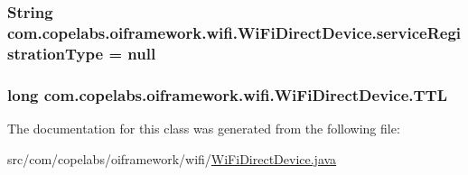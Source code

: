 \subsubsection[{service\+Registration\+Type}]{\setlength{\rightskip}{0pt plus 5cm}String com.\+copelabs.\+oiframework.\+wifi.\+Wi\+Fi\+Direct\+Device.\+service\+Registration\+Type = null\hspace{0.3cm}{\ttfamily [private]}}\label{classcom_1_1copelabs_1_1oiframework_1_1wifi_1_1_wi_fi_direct_device_a53d05b7aa0924e76b0c2b567affb1112}
\hypertarget{classcom_1_1copelabs_1_1oiframework_1_1wifi_1_1_wi_fi_direct_device_aedc5d49186dfa466662e225490009b2c}{}
\subsubsection[{T\+T\+L}]{\setlength{\rightskip}{0pt plus 5cm}long com.\+copelabs.\+oiframework.\+wifi.\+Wi\+Fi\+Direct\+Device.\+T\+T\+L\hspace{0.3cm}{\ttfamily [private]}}\label{classcom_1_1copelabs_1_1oiframework_1_1wifi_1_1_wi_fi_direct_device_aedc5d49186dfa466662e225490009b2c}


The documentation for this class was generated from the following file\+:\begin{DoxyCompactItemize}
\item 
src/com/copelabs/oiframework/wifi/\hyperlink{_wi_fi_direct_device_8java}{Wi\+Fi\+Direct\+Device.\+java}\end{DoxyCompactItemize}
